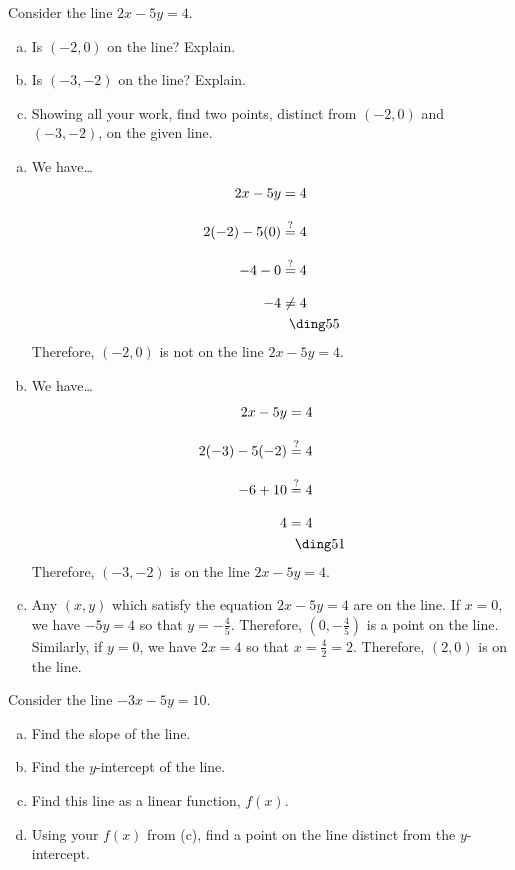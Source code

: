 \documentclass[11pt,letterpaper]{article}
\begin{document}

 Consider the line $2x - 5y= 4$.
	\begin{enumerate}[(a)]
	\item Is $(-2, 0)$ on the line? Explain.
	\item Is $(-3, -2)$ on the line? Explain.
	\item Showing all your work, find two points, distinct from $(-2, 0)$ and $(-3, -2)$, on the given line. 
	\end{enumerate} \pspace

\sol 
\begin{enumerate}[(a)]
\item We have\dots
	\[
	\begin{aligned}
	2x - 5y&= 4 \\[0.3cm]
	2(-2) - 5(0)&\stackrel{?}{=} 4 \\[0.3cm]
	-4 - 0&\stackrel{?}{=} 4 \\[0.3cm]
	-4 &\neq 4 \\
	&\;\;\text{\xmark}
	\end{aligned}
	\]
Therefore, $(-2, 0)$ is not on the line $2x - 5y= 4$. \pspace

\item We have\dots
	\[
	\begin{aligned}
	2x - 5y&= 4 \\[0.3cm]
	2(-3) - 5(-2)&\stackrel{?}{=} 4 \\[0.3cm]
	-6 + 10&\stackrel{?}{=} 4 \\[0.3cm]
	4&= 4 \\
	&\;\;\text{\cmark}
	\end{aligned}
	\]
Therefore, $(-3, -2)$ is on the line $2x - 5y= 4$. \pspace

\item Any $(x, y)$ which satisfy the equation $2x - 5y= 4$ are on the line. If $x= 0$, we have $-5y= 4$ so that $y= -\frac{4}{5}$. Therefore, $(0, -\frac{4}{5})$ is a point on the line. Similarly, if $y= 0$, we have $2x= 4$ so that $x= \frac{4}{2}= 2$. Therefore, $(2, 0)$ is on the line. 
\end{enumerate}



\newpage



 Consider the line $-3x - 5y= 10$.
	\begin{enumerate}[(a)]
	\item Find the slope of the line.
	\item Find the $y$-intercept of the line.
	\item Find this line as a linear function, $f(x)$.
	\item Using your $f(x)$ from (c), find a point on the line distinct from the $y$-intercept.	
	\end{enumerate} \pspace
\end{document}
